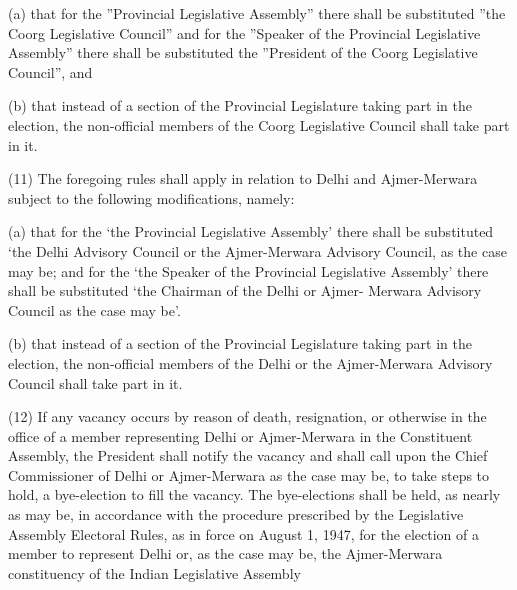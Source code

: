 (a) that for the ''Provincial Legislative Assembly'' there shall be substituted ''the Coorg Legislative Council'' and for the ''Speaker of the Provincial Legislative Assembly'' there shall be substituted the ''President of the Coorg Legislative Council'', and

(b) that instead of a section of the Provincial Legislature taking part in the election, the non-official members of the Coorg Legislative Council shall take part in it.



(11) The foregoing rules shall apply in relation to Delhi and Ajmer-Merwara subject to the following modifications, namely:



(a) that for the \textquoteleft{}the Provincial Legislative Assembly\textquoteright{} there shall be substituted \textquoteleft{}the Delhi Advisory Council or the Ajmer-Merwara Advisory Council, as the case may be; and for the \textquoteleft{}the Speaker of the Provincial Legislative Assembly\textquoteright{} there shall be substituted \textquoteleft{}the Chairman of the Delhi or Ajmer- Merwara Advisory Council as the case may be\textquoteright{}.



(b) that instead of a section of the Provincial Legislature taking part in the election, the non-official members of the Delhi or the Ajmer-Merwara Advisory Council shall take part in it.



(12) If any vacancy occurs by reason of death, resignation, or otherwise in the office of a member representing Delhi or Ajmer-Merwara in the Constituent Assembly, the President shall notify the vacancy and shall call upon the Chief Commissioner of Delhi or Ajmer-Merwara as the case may be, to take steps to hold, a bye-election to fill the vacancy. The bye-elections shall be held, as nearly as may be, in accordance with the procedure prescribed by the Legislative Assembly Electoral Rules, as in force on August 1, 1947, for the election of a member to represent Delhi or, as the case may be, the Ajmer-Merwara constituency of the Indian Legislative Assembly



